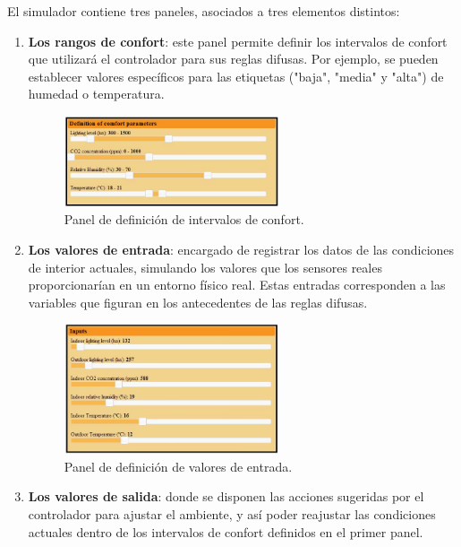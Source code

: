 El simulador contiene tres paneles, asociados a tres elementos distintos:
\begin{enumerate}
	\item \textbf{Los rangos de confort}: este panel permite definir los intervalos de confort que utilizará el controlador para sus reglas difusas. Por ejemplo, se pueden establecer valores específicos para las etiquetas ("baja", "media" y "alta") de humedad o temperatura.
	
	\begin{figure}[H]
		\centering
		\includegraphics[width=0.6\textwidth]{imgs/simulator-comfort-params.JPG}
		\caption{Panel de definición de intervalos de confort.}
		\label{fig:simulator-comfort-params}
	\end{figure}
	
	\item \textbf{Los valores de entrada}: encargado de registrar los datos de las condiciones de interior actuales, simulando los valores que los sensores reales proporcionarían en un entorno físico real. Estas entradas corresponden a las variables que figuran en los antecedentes de las reglas difusas.
	
	\begin{figure}[H]
		\centering
		\includegraphics[width=0.6\textwidth]{imgs/simulator-panel-inputs.JPG}
		\caption{Panel de definición de valores de entrada.}
		\label{fig:simulator-panel-inputs}
	\end{figure}
	
	\item \textbf{Los valores de salida}: donde se disponen las acciones sugeridas por el controlador para ajustar el ambiente, y así poder reajustar las condiciones actuales dentro de los intervalos de confort definidos en el primer panel.
	

\end{enumerate}

